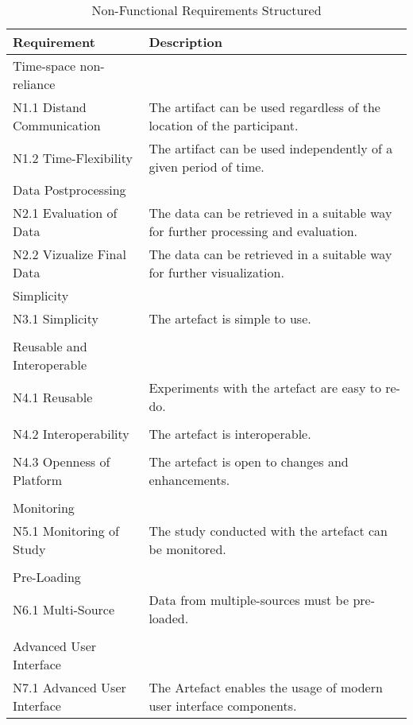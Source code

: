 \begin{table}
    \centering
    \small
    \begin{tabular}{L{0.35\textwidth}L{0.59\textwidth}}
    \hline
Requirement                             & Description \\ \hline
    Time-space non-reliance     &             \\ \hline
    N1.1 Distand Communication      & The artifact can be used regardless of the location of the participant.            \\
    N1.2 Time-Flexibility           & The artifact can be used independently of a given period of time.            \\ \hline
    Data Postprocessing &             \\ \hline
    N2.1 Evaluation of Data         & The data can be retrieved in a suitable way for further processing and evaluation.            \\
    N2.2 Vizualize Final Data       & The data can be retrieved in a suitable way for further visualization.             \\ \hline
    Simplicity                  &            \\ \hline
    N3.1 Simplicity                 & The artefact is simple to use.           \\
    & \\ \hline
    Reusable and Interoperable  &             \\ \hline
    N4.1 Reusable                   & Experiments with the artefact are easy to re-do.           \\
    & \\
    N4.2 Interoperability           & The artefact is interoperable.            \\
    & \\
    N4.3 Openness of Platform       & The artefact is open to changes and enhancements. \\
    & \\ \hline
    Monitoring                  &             \\ \hline
    N5.1 Monitoring of Study        & The study conducted with the artefact can be monitored.            \\ 
    & \\ \hline
    Pre-Loading                 &             \\ \hline
    N6.1 Multi-Source             & Data from multiple-sources must be pre-loaded.            \\ 
    & \\ \hline
    Advanced User Interface   &             \\ \hline
    N7.1 Advanced User Interface  & The Artefact enables the usage of modern user interface components.            \\ \hline
    \end{tabular}
    \caption[Non-Functional Requirements Structured]{Non-Functional Requirements Structured}\label{tab:NonFuncRequirementsCat}
    \end{table}
